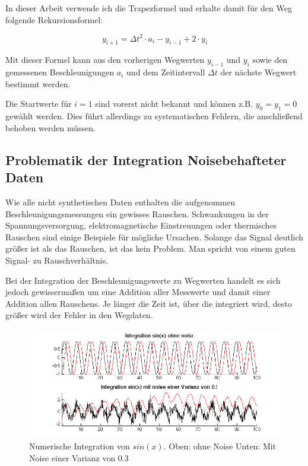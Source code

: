 \documentclass[12pt,a4paper,twoside,BCOR=12.5mm]{scrartcl}
\begin{document}
In dieser Arbeit verwende ich die Trapezformel und erhalte damit für den Weg folgende Rekursionsformel:

\begin{equation}
y_{i+1} = \Delta t^2 \cdot a_i - y_{i-1} + 2 \cdot y_i
\end{equation}

Mit dieser Formel kann aus den vorherigen Wegwerten $y_{i-1}$ und $y_i$ sowie den gemessenen Beschleunigungen $a_i$ und dem Zeitintervall $\Delta t$ der nächste Wegwert bestimmt werden.

Die Startwerte für $i=1$ sind vorerst nicht bekannt und können z.B. $y_0 = y_1 = 0$ gewählt werden. Dies führt allerdings zu systematischen Fehlern, die anschließend behoben werden müssen.


\subsection{Problematik der Integration Noisebehafteter Daten}
\label{noiseproblem}
Wie alle nicht synthetischen Daten enthalten die aufgenommen Beschleunigungsmessungen ein gewisses Rauschen. Schwankungen in der Spannungsversorgung, elektromagnetische Einstreuungen oder thermisches Rauschen sind einige Beispiele für mögliche Ursachen. Solange das Signal deutlich größer ist als das Rauschen, ist das kein Problem. Man spricht von einem guten Signal- zu Rauschverhältnis. 

Bei der Integration der Beschleunigungswerte zu Wegwerten handelt es sich jedoch gewissermaßen um eine Addition aller Messwerte und damit einer Addition allen Rauschens. Je länger die Zeit ist, über die integriert wird, desto größer wird der Fehler in den Wegdaten. 

\begin{figure}[htb]
\includegraphics[scale=.55]{sinusnoise.png}
\caption{Numerische Integration von $sin(x)$. Oben: ohne Noise Unten: Mit Noise einer Varianz von 0.3}
\label{sinusnoise}
\end{figure}
\end{document}
